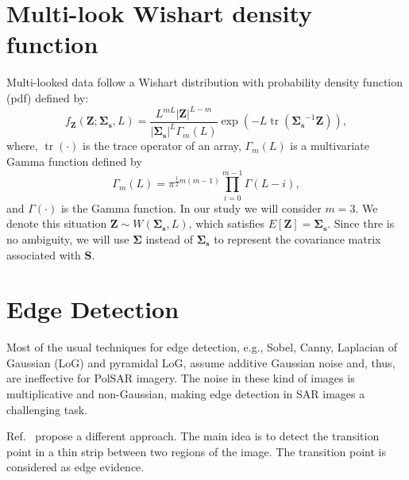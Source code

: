 \documentclass[conference]{IEEEtran}
\DeclareMathOperator{\traco}{tr}
\begin{document}
\section{Multi-look Wishart density function}\label{sec_03}

Multi-looked data follow a Wishart distribution with probability density function (pdf) defined by:
\begin{equation}
    f_{\mathbf{Z}}(\mathbf{Z};\mathbf{\Sigma_{s}},L)=\frac{L^{mL}|\mathbf{Z}|^{L-m}}{|\mathbf{\Sigma_{s}}|^{L}\Gamma_m(L)} \exp(-L\traco(\mathbf{\Sigma_{s}}^{-1}\mathbf{Z})),
    \label{eq_05}
\end{equation} 
where, $\traco(\cdot)$ is the trace operator of an array, $\Gamma_m(L)$ is a multivariate Gamma function defined by
\begin{equation*}
	\Gamma_m(L)=\pi^{\frac{1}{2}m(m-1)} \prod_{i=0}^{m-1}\Gamma(L-i),
\end{equation*}
and $\Gamma(\cdot)$ is the Gamma function.
In our study we will consider $m=3$. 
We denote this situation $\mathbf{Z}\sim W(\mathbf{\Sigma_{s}}, L)$, which satisfies $E[\mathbf{Z}]=\mathbf{\Sigma_{s}}$. 
Since thre is no ambiguity, we will use $\mathbf{\Sigma}$ instead of $\mathbf{\Sigma_{s}}$ to represent the covariance matrix associated with $\mathbf{S}$.

\section{Edge Detection}\label{sec_04}

Most of the usual techniques for edge detection, e.g., 
Sobel, Canny, Laplacian of Gaussian (LoG) and pyramidal LoG, assume additive Gaussian noise and, thus, are ineffective for PolSAR imagery.
The noise in these kind of images is multiplicative and non-Gaussian, making edge detection in SAR images a challenging task.

Ref.~\cite{nhfc, gmbf} propose a different approach.
The main idea is to detect the transition point in a thin strip between two regions of the image. 
The transition point is considered as edge evidence. 
\end{document}
